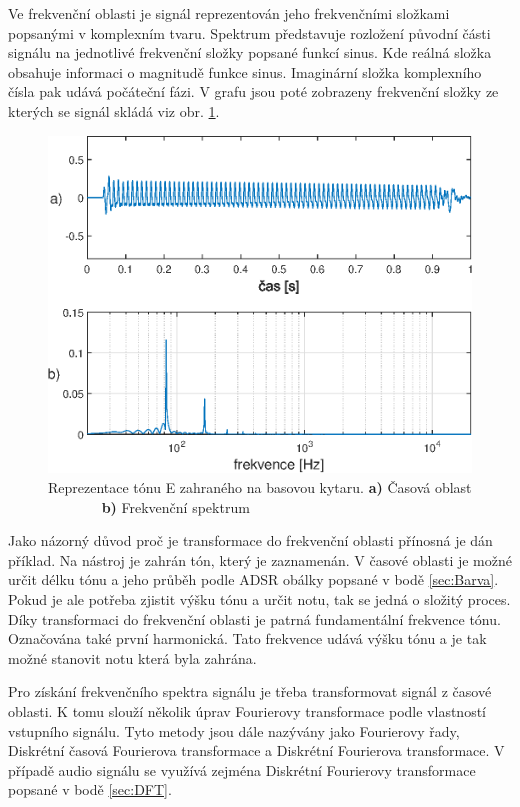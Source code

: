   Ve frekvenční oblasti je signál reprezentován jeho frekvenčními složkami popsanými v komplexním tvaru.
  Spektrum představuje rozložení původní části signálu na jednotlivé frekvenční složky popsané funkcí sinus. Kde reálná složka obsahuje informaci o magnitudě  funkce sinus.
  Imaginární složka komplexního čísla pak udává počáteční fázi.
  V grafu jsou poté zobrazeny frekvenční složky ze kterých se signál skládá viz obr. \ref{fig:Bass_tone}.

  \begin{figure}[H]
    \centering
        \includegraphics[width = 0.8\linewidth]{obrazky/Bass_tone_spectrum.eps}
    \caption{Reprezentace tónu E zahraného na basovou kytaru. \textbf{a)} Časová oblast ~ ~ ~ ~ ~\textbf{b)} Frekvenční spektrum}
    \label{fig:Bass_tone}
\end{figure}
  
  Jako názorný důvod proč je transformace do frekvenční oblasti přínosná je dán příklad. Na nástroj je zahrán tón, který je zaznamenán. 
  V časové oblasti je možné určit délku tónu a jeho průběh podle ADSR obálky popsané v bodě \ref{sec:Barva}.
  Pokud je ale potřeba zjistit výšku tónu a určit notu, tak se jedná o složitý proces.
  Díky transformaci do frekvenční oblasti je patrná fundamentální frekvence tónu.
  Označována také první harmonická.
  Tato frekvence udává výšku tónu a je tak možné stanovit notu která byla zahrána.

  Pro získání frekvenčního spektra signálu je třeba transformovat signál z časové oblasti. K tomu slouží několik úprav Fourierovy transformace podle vlastností vstupního signálu. Tyto metody jsou dále nazývány jako Fourierovy řady, Diskrétní časová Fourierova transformace a Diskrétní Fourierova transformace. V případě audio signálu se využívá zejména Diskrétní Fourierovy transformace popsané v bodě \ref{sec:DFT}.


